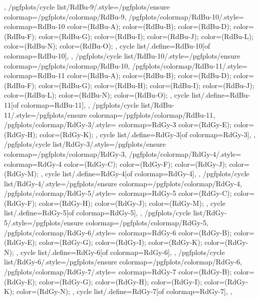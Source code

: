 {{  },
  /pgfplots/cycle list/RdBu-9/.style={/pgfplots/ensure colormap={/pgfplots/colormap/RdBu-9}},
  /pgfplots/colormap/RdBu-10/.style={
    colormap={RdBu-10}{
      color=(RdBu-A);
      color=(RdBu-B);
      color=(RdBu-D);
      color=(RdBu-F);
      color=(RdBu-G);
      color=(RdBu-I);
      color=(RdBu-J);
      color=(RdBu-L);
      color=(RdBu-N);
      color=(RdBu-O);
    },
    cycle list/.define={RdBu-10}{[of colormap=RdBu-10]},
  },
  /pgfplots/cycle list/RdBu-10/.style={/pgfplots/ensure colormap={/pgfplots/colormap/RdBu-10}},
  /pgfplots/colormap/RdBu-11/.style={
    colormap={RdBu-11}{
      color=(RdBu-A);
      color=(RdBu-B);
      color=(RdBu-D);
      color=(RdBu-F);
      color=(RdBu-G);
      color=(RdBu-H);
      color=(RdBu-I);
      color=(RdBu-J);
      color=(RdBu-L);
      color=(RdBu-N);
      color=(RdBu-O);
    },
    cycle list/.define={RdBu-11}{[of colormap=RdBu-11]},
  },
  /pgfplots/cycle list/RdBu-11/.style={/pgfplots/ensure colormap={/pgfplots/colormap/RdBu-11}},
  /pgfplots/colormap/RdGy-3/.style={
    colormap={RdGy-3}{
      color=(RdGy-E);
      color=(RdGy-H);
      color=(RdGy-K);
    },
    cycle list/.define={RdGy-3}{[of colormap=RdGy-3]},
  },
  /pgfplots/cycle list/RdGy-3/.style={/pgfplots/ensure colormap={/pgfplots/colormap/RdGy-3}},
  /pgfplots/colormap/RdGy-4/.style={
    colormap={RdGy-4}{
      color=(RdGy-C);
      color=(RdGy-F);
      color=(RdGy-J);
      color=(RdGy-M);
    },
    cycle list/.define={RdGy-4}{[of colormap=RdGy-4]},
  },
  /pgfplots/cycle list/RdGy-4/.style={/pgfplots/ensure colormap={/pgfplots/colormap/RdGy-4}},
  /pgfplots/colormap/RdGy-5/.style={
    colormap={RdGy-5}{
      color=(RdGy-C);
      color=(RdGy-F);
      color=(RdGy-H);
      color=(RdGy-J);
      color=(RdGy-M);
    },
    cycle list/.define={RdGy-5}{[of colormap=RdGy-5]},
  },
  /pgfplots/cycle list/RdGy-5/.style={/pgfplots/ensure colormap={/pgfplots/colormap/RdGy-5}},
  /pgfplots/colormap/RdGy-6/.style={
    colormap={RdGy-6}{
      color=(RdGy-B);
      color=(RdGy-E);
      color=(RdGy-G);
      color=(RdGy-I);
      color=(RdGy-K);
      color=(RdGy-N);
    },
    cycle list/.define={RdGy-6}{[of colormap=RdGy-6]},
  },
  /pgfplots/cycle list/RdGy-6/.style={/pgfplots/ensure colormap={/pgfplots/colormap/RdGy-6}},
  /pgfplots/colormap/RdGy-7/.style={
    colormap={RdGy-7}{
      color=(RdGy-B);
      color=(RdGy-E);
      color=(RdGy-G);
      color=(RdGy-H);
      color=(RdGy-I);
      color=(RdGy-K);
      color=(RdGy-N);
    },
    cycle list/.define={RdGy-7}{[of colormap=RdGy-7]},
  },
}
